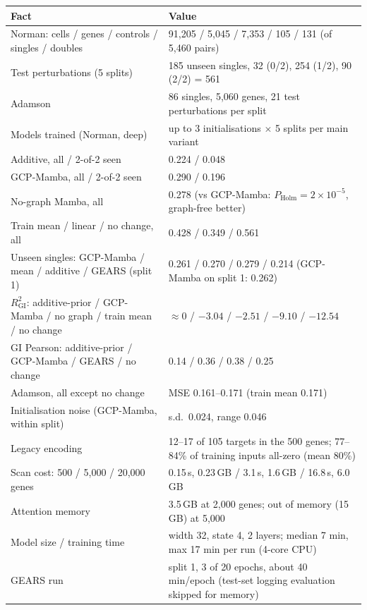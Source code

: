\documentclass[10.5pt]{article}
\begin{document}
\begin{center}\small
\begin{tabular}{@{}p{7.2cm}p{8.3cm}@{}}
\toprule
\textbf{Fact} & \textbf{Value}\\
\midrule
Norman: cells / genes / controls / singles / doubles & 91,205 / 5,045 / 7,353 / 105 / 131 (of 5,460 pairs)\\
Test perturbations (5 splits) & 185 unseen singles, 32 (0/2), 254 (1/2), 90 (2/2) = 561\\
Adamson & 86 singles, 5,060 genes, 21 test perturbations per split\\
Models trained (Norman, deep) & up to 3 initialisations $\times$ 5 splits per main variant\\
Additive, all / 2-of-2 seen & 0.224 / 0.048\\
GCP-Mamba, all / 2-of-2 seen & 0.290 / 0.196\\
No-graph Mamba, all & 0.278 (vs GCP-Mamba: $P_{\mathrm{Holm}}=2\times10^{-5}$, graph-free better)\\
Train mean / linear / no change, all & 0.428 / 0.349 / 0.561\\
Unseen singles: GCP-Mamba / mean / additive / GEARS (split 1) & 0.261 / 0.270 / 0.279 / 0.214 (GCP-Mamba on split 1: 0.262)\\
$R^2_{\mathrm{GI}}$: additive-prior / GCP-Mamba / no graph / train mean / no change & $\approx0$ / $-3.04$ / $-2.51$ / $-9.10$ / $-12.54$\\
GI Pearson: additive-prior / GCP-Mamba / GEARS / no change & 0.14 / 0.36 / 0.38 / 0.25\\
Adamson, all except no change & MSE 0.161--0.171 (train mean 0.171)\\
Initialisation noise (GCP-Mamba, within split) & s.d.\ 0.024, range 0.046\\
Legacy encoding & 12--17 of 105 targets in the 500 genes; 77--84\% of training inputs all-zero (mean 80\%)\\
Scan cost: 500 / 5,000 / 20,000 genes & 0.15\,s, 0.23\,GB / 3.1\,s, 1.6\,GB / 16.8\,s, 6.0\,GB\\
Attention memory & 3.5\,GB at 2,000 genes; out of memory (15\,GB) at 5,000\\
Model size / training time & width 32, state 4, 2 layers; median 7 min, max 17 min per run (4-core CPU)\\
GEARS run & split 1, 3 of 20 epochs, about 40 min/epoch (test-set logging evaluation skipped for memory)\\
\bottomrule
\end{tabular}
\end{center}
\end{document}

